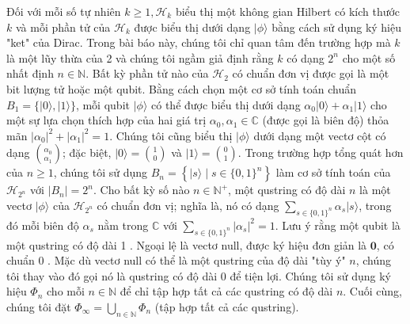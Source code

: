 \documentclass[10pt]{article}
\begin{document}
Đối với mỗi số tự nhiên $k \geq 1, \mathcal{H}_{k}$ biểu thị một không gian Hilbert có kích thước $k$ và mỗi phần tử của $\mathcal{H}_{k}$ được biểu thị dưới dạng $|\phi\rangle$ bằng cách sử dụng ký hiệu "ket" của Dirac. Trong bài báo này, chúng tôi chỉ quan tâm đến trường hợp mà $k$ là một lũy thừa của 2 và chúng tôi ngầm giả định rằng $k$ có dạng $2^{n}$ cho một số nhất định $n \in \mathbb{N}$. Bất kỳ phần tử nào của $\mathcal{H}_{2}$ có chuẩn đơn vị được gọi là một bit lượng tử hoặc một qubit. Bằng cách chọn một cơ sở tính toán chuẩn $B_{1}=\{|0\rangle,|1\rangle\}$, mỗi qubit $|\phi\rangle$ có thể được biểu thị dưới dạng $\alpha_{0}|0\rangle+\alpha_{1}|1\rangle$ cho một sự lựa chọn thích hợp của hai giá trị $\alpha_{0}, \alpha_{1} \in \mathbb{C}$ (được gọi là biên độ) thỏa mãn $\left|\alpha_{0}\right|^{2}+\left|\alpha_{1}\right|^{2}=1$. Chúng tôi cũng biểu thị $|\phi\rangle$ dưới dạng một vectơ cột có dạng $\binom{\alpha_{0}}{\alpha_{1}}$; đặc biệt, $|0\rangle=\binom{1}{0}$ và $|1\rangle=\binom{0}{1}$. Trong trường hợp tổng quát hơn của $n \geq 1$, chúng tôi sử dụng $B_{n}=\left\{|s\rangle \mid s \in\{0,1\}^{n}\right\}$ làm cơ sở tính toán của $\mathcal{H}_{2^{n}}$ với $\left|B_{n}\right|=2^{n}$. Cho bất kỳ số nào $n \in \mathbb{N}^{+}$, một qustring có độ dài $n$ là một vectơ $|\phi\rangle$ của $\mathcal{H}_{2^{n}}$ có chuẩn đơn vị; nghĩa là, nó có dạng $\sum_{s \in\{0,1\}^{n}} \alpha_{s}|s\rangle$, trong đó mỗi biên độ $\alpha_{s}$ nằm trong $\mathbb{C}$ với $\sum_{s \in\{0,1\}^{n}}\left|\alpha_{s}\right|^{2}=1$. Lưu ý rằng một qubit là một qustring có độ dài 1 . Ngoại lệ là vectơ null, được ký hiệu đơn giản là $\mathbf{0}$, có chuẩn 0 . Mặc dù vectơ null có thể là một qustring của độ dài "tùy ý" $n$, chúng tôi thay vào đó gọi nó là qustring có độ dài 0 để tiện lợi. Chúng tôi sử dụng ký hiệu $\Phi_{n}$ cho mỗi $n \in \mathbb{N}$ để chỉ tập hợp tất cả các qustring có độ dài $n$. Cuối cùng, chúng tôi đặt $\Phi_{\infty}=\bigcup_{n \in \mathbb{N}} \Phi_{n}$ (tập hợp tất cả các qustring).
\end{document}
